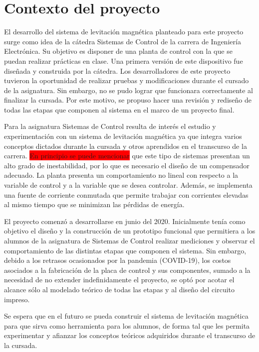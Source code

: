 \section{Contexto del proyecto}

El desarrollo del sistema de levitación magnética planteado para este proyecto surge como idea de la cátedra Sistemas de Control de la carrera de Ingeniería Electrónica. Su objetivo es disponer de una planta de control con la  que se puedan realizar prácticas en clase. Una primera versión de este dispositivo fue diseñada y construida por la cátedra. Los desarrolladores de este proyecto tuvieron la oportunidad de realizar pruebas y modificaciones durante el cursado de la asignatura. Sin embargo, no se pudo lograr que funcionara correctamente al finalizar la cursada. Por este motivo, se propuso hacer una revisión y rediseño de todas las etapas que componen al sistema en el marco de un proyecto final.

Para la asignatura Sistemas de Control resulta de interés el estudio y experimentación con un sistema de levitación magnética ya que integra varios conceptos dictados durante la cursada y otros aprendidos en el transcurso de la carrera. \colorbox{red}{En principio se puede mencionar} que este tipo de sistemas presentan un alto grado de inestabilidad, por lo que es necesario el diseño de un compensador adecuado. La planta presenta un comportamiento no lineal con respecto a la variable de control y a la variable que se desea controlar. Además, se implementa una fuente de corriente conmutada que permite trabajar con corrientes elevadas al mismo tiempo que se minimizan las pérdidas de energía.

El proyecto comenzó a desarrollarse en junio del 2020. Inicialmente tenía como objetivo el diseño y la construcción de un prototipo funcional que permitiera a los alumnos de la asignatura de Sistemas de Control realizar mediciones y observar el comportamiento de las distintas etapas que componen el sistema. Sin embargo, debido a los retrasos ocasionados por la pandemia (COVID-19), los costos asociados a la fabricación de la placa de control y sus componentes, sumado a la  necesidad de no extender indefinidamente el proyecto, se optó por acotar el alcance sólo al modelado teórico de todas las etapas y al diseño del circuito impreso.

Se espera que en el futuro se pueda construir el sistema de levitación magnética para que sirva como herramienta para los alumnos, de forma tal que les permita experimentar y afianzar los conceptos teóricos adquiridos durante el transcurso de la cursada.


